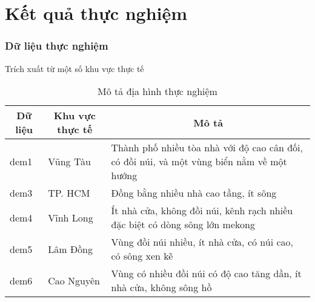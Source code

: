 \section{Kết quả thực nghiệm}

\begin{frame}
    \frametitle{Dữ liệu thực nghiệm}
    Trích xuất từ một số khu vực thực tế

    \begin{table}[]
        \begin{tabularx}{\textwidth}{|l|l|X|}
            \hline
            \multicolumn{1}{|c|}{\textbf{Dữ liệu}} & \multicolumn{1}{c|}{\textbf{Khu vực thực tế}} & \multicolumn{1}{c|}{\textbf{Mô tả}}                                                                 \\ \hline
            dem1 & Vũng Tàu                             & Thành phố nhiều tòa nhà với độ cao cân đối, có đồi núi, và một vùng biển nằm về một hướng  \\ \hline
            dem3 & TP. HCM                           & Đồng bằng nhiều nhà cao tầng, ít sông                            \\ \hline
            dem4 & Vĩnh Long                            & Ít nhà cửa, không đồi núi, kênh rạch nhiều đặc biệt có dòng sông lớn mekong                \\ \hline
            dem5 & Lâm Đồng                             & Vùng đồi núi nhiều, ít nhà cửa, có núi cao, có sông xen kẽ                                \\ \hline
            dem6 & Cao Nguyên                           & Vùng có nhiều đồi núi có độ cao tăng dần, ít nhà cửa, không sông hồ                        \\ \hline
        \end{tabularx}
        \caption{Mô tả địa hình thực nghiệm}
    \end{table}

\end{frame}

